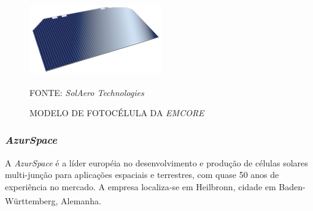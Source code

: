 \documentclass[
	12pt,				%
	openright,			%
	oneside,			%
	a4paper,			%
	english,			%
	french,				%
	spanish,			%
	brazil,				%
	oldfontcommands
	]{abntex2}
\begin{document}
	\begin{figure}[th]
		\caption{MODELO DE FOTOCÉLULA DA \textit{EMCORE}}
		\label{Fig_Cell_Emcore}
		\centering
		\includegraphics[width=0.5\linewidth]{./figs/ZTJ}
			
		\begin{small}
			FONTE: \textit{SolAero Technologies}\textsuperscript{\cite{Emcore3}}
		\end{small}		
	\end{figure}
	
\subsubsection[AzurSpace]{\textit{AzurSpace}}

	A \textit{AzurSpace} é a líder européia no desenvolvimento e produção de células solares multi-junção para aplicações espaciais e terrestres, com quase 50 anos de experiência no mercado. A empresa localiza-se em Heilbronn, cidade em Baden-Württemberg, Alemanha.\textsuperscript{\cite{AzurSpace}}
	
\end{document}
